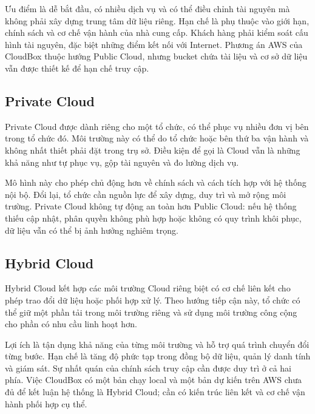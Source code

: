 Ưu điểm là dễ bắt đầu, có nhiều dịch vụ và có thể điều chỉnh tài nguyên mà không phải xây dựng trung tâm dữ liệu riêng. Hạn chế là phụ thuộc vào giới hạn, chính sách và cơ chế vận hành của nhà cung cấp. Khách hàng phải kiểm soát cấu hình tài nguyên, đặc biệt những điểm kết nối với Internet. Phương án AWS của CloudBox thuộc hướng Public Cloud, nhưng bucket chứa tài liệu và cơ sở dữ liệu vẫn được thiết kế để hạn chế truy cập.

\subsection{Private Cloud}
Private Cloud được dành riêng cho một tổ chức, có thể phục vụ nhiều đơn vị bên trong tổ chức đó. Môi trường này có thể do tổ chức hoặc bên thứ ba vận hành và không nhất thiết phải đặt trong trụ sở. Điều kiện để gọi là Cloud vẫn là những khả năng như tự phục vụ, gộp tài nguyên và đo lường dịch vụ.

Mô hình này cho phép chủ động hơn về chính sách và cách tích hợp với hệ thống nội bộ. Đổi lại, tổ chức cần nguồn lực để xây dựng, duy trì và mở rộng môi trường. Private Cloud không tự động an toàn hơn Public Cloud: nếu hệ thống thiếu cập nhật, phân quyền không phù hợp hoặc không có quy trình khôi phục, dữ liệu vẫn có thể bị ảnh hưởng nghiêm trọng.

\subsection{Hybrid Cloud}
Hybrid Cloud kết hợp các môi trường Cloud riêng biệt có cơ chế liên kết cho phép trao đổi dữ liệu hoặc phối hợp xử lý. Theo hướng tiếp cận này, tổ chức có thể giữ một phần tải trong môi trường riêng và sử dụng môi trường công cộng cho phần có nhu cầu linh hoạt hơn.

Lợi ích là tận dụng khả năng của từng môi trường và hỗ trợ quá trình chuyển đổi từng bước. Hạn chế là tăng độ phức tạp trong đồng bộ dữ liệu, quản lý danh tính và giám sát. Sự nhất quán của chính sách truy cập cần được duy trì ở cả hai phía. Việc CloudBox có một bản chạy local và một bản dự kiến trên AWS chưa đủ để kết luận hệ thống là Hybrid Cloud; cần có kiến trúc liên kết và cơ chế vận hành phối hợp cụ thể.

